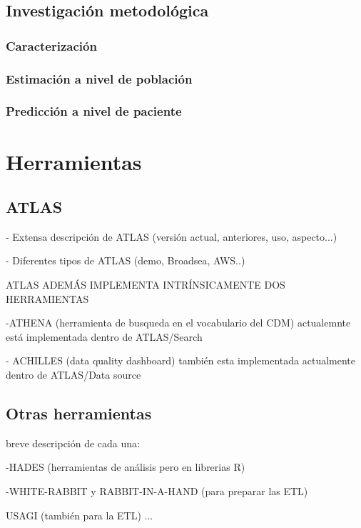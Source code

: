 \subsection{Investigación metodológica} \label{subsec:05investMetodolog}




\subsubsection{Caracterización}
\subsubsection{Estimación a nivel de población}
\subsubsection{Predicción a nivel de paciente}


\section{Herramientas} \label{sec:05herramientas}
\subsection{ATLAS}

- Extensa descripción de ATLAS (versión actual, anteriores, uso, aspecto...)

- Diferentes tipos de ATLAS (demo, Broadsea, AWS..)

ATLAS ADEMÁS IMPLEMENTA INTRÍNSICAMENTE  DOS HERRAMIENTAS

-ATHENA (herramienta de busqueda en el vocabulario del CDM) actualemnte está implementada dentro de ATLAS/Search

- ACHILLES (data quality dashboard) también esta implementada actualmente dentro de ATLAS/Data source


\subsection{Otras herramientas}

breve descripción de cada una:

-HADES (herramientas de análisis pero en librerias R)

-WHITE-RABBIT y RABBIT-IN-A-HAND (para preparar las ETL)

USAGI (también para la ETL)
...

